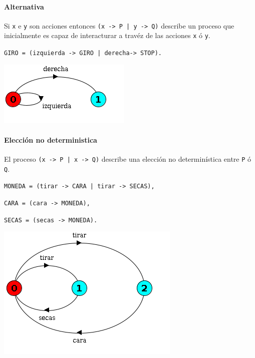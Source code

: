 \paragraph{Alternativa} 
Si \texttt{x} e \texttt{y} son acciones entonces \texttt{(x -> P | y -> Q)} describe un proceso que inicialmente es capaz de interacturar a travéz de las acciones \texttt{x} ó \texttt{y}. 
\begin{center}
\begin{minipage}{0.55\textwidth}
\texttt{GIRO = (izquierda -> GIRO | derecha-> STOP).}
\end{minipage}

\vspace*{0.25cm}
\begin{minipage}{0.5\textwidth}
	\includegraphics[scale=0.75]{imagenes/lts-giro}
\end{minipage}
\end{center}

\paragraph{Elección no deterministica}
El proceso \texttt{(x -> P | x -> Q)} describe una elección no determinística entre \texttt{P} ó \texttt{Q}.
\begin{center}
\begin{minipage}{0.55\textwidth}
\texttt{MONEDA = (tirar -> CARA | tirar -> SECAS),}

\texttt{CARA = (cara -> MONEDA),}

\texttt{SECAS = (secas -> MONEDA).}
\end{minipage}

\vspace*{0.25cm}
\begin{minipage}{0.5\textwidth}
	\includegraphics[scale=0.75]{imagenes/lts-moneda}
\end{minipage}
\end{center}
